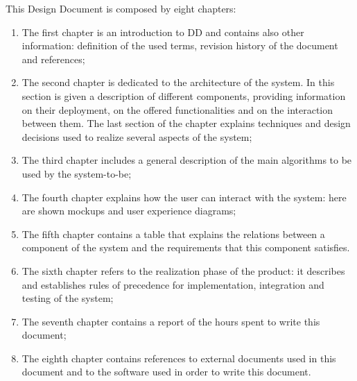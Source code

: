 This Design Document is composed by eight chapters:
\begin{enumerate}
\item The first chapter is an introduction to DD and contains also other information: definition of the used terms, revision history of the document and references;
\item The second chapter is dedicated to the architecture of the system. In this section is given a description of different components, providing information on their deployment, on the offered functionalities and on the interaction between them. The last section of the chapter explains techniques and design decisions used to realize several aspects of the system;
\item The third chapter includes a general description of the main algorithms to be used by the system-to-be;
\item The fourth chapter explains how the user can interact with the system: here are shown mockups and user experience diagrams;
\item The fifth chapter contains a table that explains the relations between a component of the system and the requirements that this component satisfies.
\item The sixth chapter refers to the realization phase of the product: it describes and establishes rules of precedence for implementation, integration and testing of the system;
\item The seventh chapter contains a report of the hours spent to write this document;
\item The eighth chapter contains references to external documents used in this document and to the software used in order to write this document.
\end{enumerate}
